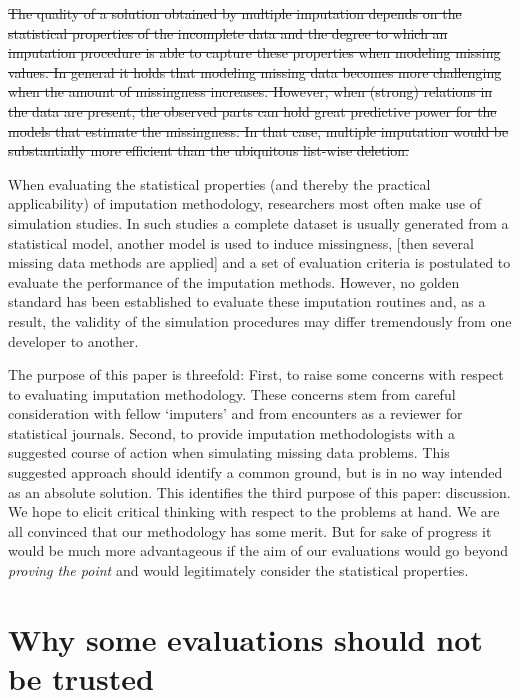 \documentclass[
]{article}
\begin{document}
\sout{The quality of a solution obtained by multiple imputation depends
on the statistical properties of the incomplete data and the degree to
which an imputation procedure is able to capture these properties when
modeling missing values. In general it holds that modeling missing data
becomes more challenging when the amount of missingness increases.
However, when (strong) relations in the data are present, the observed
parts can hold great predictive power for the models that estimate the
missingness. In that case, multiple imputation would be substantially
more efficient than the ubiquitous list-wise deletion.}

When evaluating the statistical properties (and thereby the practical
applicability) of imputation methodology, researchers most often make
use of simulation studies. In such studies a complete dataset is usually
generated from a statistical model, another model is used to induce
missingness, {[}then several missing data methods are applied{]} and a
set of evaluation criteria is postulated to evaluate the performance of
the imputation methods. However, no golden standard has been established
to evaluate these imputation routines and, as a result, the validity of
the simulation procedures may differ tremendously from one developer to
another.

The purpose of this paper is threefold: First, to raise some concerns
with respect to evaluating imputation methodology. These concerns stem
from careful consideration with fellow `imputers' and from encounters as
a reviewer for statistical journals. Second, to provide imputation
methodologists with a suggested course of action when simulating missing
data problems. This suggested approach should identify a common ground,
but is in no way intended as an absolute solution. This identifies the
third purpose of this paper: discussion. We hope to elicit critical
thinking with respect to the problems at hand. We are all convinced that
our methodology has some merit. But for sake of progress it would be
much more advantageous if the aim of our evaluations would go beyond
\emph{proving the point} and would legitimately consider the statistical
properties.

\hypertarget{why-some-evaluations-should-not-be-trusted}{%
\section{Why some evaluations should not be
trusted}\label{why-some-evaluations-should-not-be-trusted}}
\end{document}
